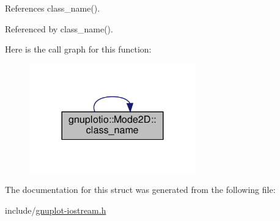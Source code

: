 References class\+\_\+name().



Referenced by class\+\_\+name().

Here is the call graph for this function\+:\nopagebreak
\begin{figure}[H]
\begin{center}
\leavevmode
\includegraphics[width=204pt]{structgnuplotio_1_1_mode2_d_aaf35c9cd117de8bc5dbc2d5ec1224232_cgraph}
\end{center}
\end{figure}


The documentation for this struct was generated from the following file\+:\begin{DoxyCompactItemize}
\item 
include/\hyperlink{gnuplot-iostream_8h}{gnuplot-\/iostream.\+h}\end{DoxyCompactItemize}

